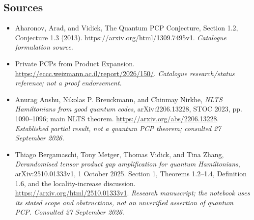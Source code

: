 \documentclass[11pt,a4paper]{article}
\numberwithin{equation}{section}
\begin{document}
\subsection{Sources}
\begin{itemize}\raggedright
\item[\textnormal{[S1]}]\hypertarget{source:41:1}{} Aharonov, Arad, and Vidick, The Quantum PCP Conjecture, Section 1.2, Conjecture 1.3 (2013).
\url{https://arxiv.org/html/1309.7495v1}.
{\small\textit{Catalogue formulation source.}}
\item[\textnormal{[S2]}]\hypertarget{source:41:2}{} Private PCPs from Product Expansion.
\url{https://eccc.weizmann.ac.il/report/2026/150/}.
{\small\textit{Catalogue research/status reference; not a proof endorsement.}}
\item[\textnormal{[E1]}]\hypertarget{extra:41:1}{} Anurag Anshu, Nikolas P. Breuckmann,
and Chinmay Nirkhe, \emph{NLTS Hamiltonians from good quantum codes},
arXiv:2206.13228, STOC 2023, pp. 1090--1096; main NLTS theorem.
\url{https://arxiv.org/abs/2206.13228}.
{\small\textit{Established partial result, not a quantum PCP theorem;
consulted 27 September 2026.}}
\item[\textnormal{[E2]}]\hypertarget{extra:41:2}{} Thiago Bergamaschi, Tony Metger,
Thomas Vidick, and Tina Zhang, \emph{Derandomised tensor product gap
amplification for quantum Hamiltonians}, arXiv:2510.01333v1,
1 October 2025. Section 1, Theorems 1.2--1.4, Definition 1.6,
and the locality-increase discussion.
\url{https://arxiv.org/html/2510.01333v1}.
{\small\textit{Research manuscript; the notebook uses its stated scope and
obstructions, not an unverified assertion of quantum PCP.
Consulted 27 September 2026.}}
\end{itemize}
\end{document}
